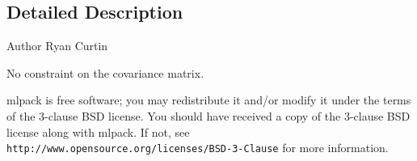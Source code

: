 \subsection{Detailed Description}
\begin{DoxyAuthor}{Author}
Ryan Curtin
\end{DoxyAuthor}
No constraint on the covariance matrix.

mlpack is free software; you may redistribute it and/or modify it under the terms of the 3-\/clause B\+SD license. You should have received a copy of the 3-\/clause B\+SD license along with mlpack. If not, see {\tt http\+://www.\+opensource.\+org/licenses/\+B\+S\+D-\/3-\/\+Clause} for more information. 